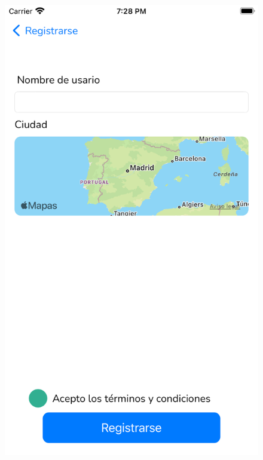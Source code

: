 \begin{appendices}
\begin{figure}[H]
\begin{minipage}{0.3\textwidth}
        \includegraphics[cframe=black 2pt, width=1\linewidth]{images/manual/registro2.png}
    \end{minipage}
     \begin{minipage}{0.3\textwidth}
        \centering

\end{minipage}
\end{figure}
\end{appendices}
